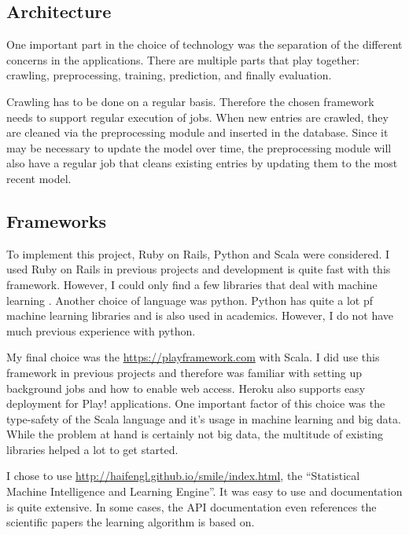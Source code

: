 
\subsection{Architecture}\label{sec:architecture}
One important part in the choice of technology was the separation of the different concerns in the applications. There are multiple parts that play together: crawling, preprocessing, training, prediction, and finally evaluation. 

Crawling has to be done on a regular basis. Therefore the chosen framework needs to support regular execution of jobs. When new entries are crawled, they are cleaned via the preprocessing module and inserted in the database. Since it may be necessary to update the model over time, the preprocessing module will also have a regular job that cleans existing entries by updating them to the most recent model.



\subsection{Frameworks}\label{sec:frameworks}
To implement this project, Ruby on Rails, Python and Scala were considered. I used Ruby on Rails in previous projects and development is quite fast with this framework. However, I could only find a few libraries that deal with machine learning \cite{bigml} \cite{leanpanda}. 
Another choice of language was python. Python has quite a lot pf machine learning libraries and is also used in academics. However, I do not have much previous experience with python.

My final choice was the \href{Play! framework}{https://playframework.com} with Scala. I did use this framework in previous projects and therefore was familiar with setting up background jobs and how to enable web access. Heroku also supports easy deployment for Play! applications. One important factor of this choice was the type-safety of the Scala language and it's usage in machine learning and big data. While the problem at hand is certainly not big data, the multitude of existing libraries helped a lot to get started.

I chose to use \href{Smile}{http://haifengl.github.io/smile/index.html}, the ``Statistical Machine Intelligence and Learning Engine''. It was easy to use and documentation is quite extensive. In some cases, the API documentation even references the scientific papers the learning algorithm is based on. 



